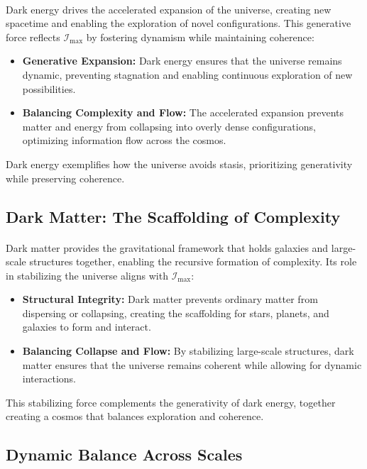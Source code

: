 \documentclass[12pt]{article}
\begin{document}
\paragraph{}
Dark energy drives the accelerated expansion of the universe, creating new spacetime and enabling the exploration of novel configurations. This generative force reflects \(\mathcal{I}_{\text{max}}\) by fostering dynamism while maintaining coherence:
\begin{itemize}
    \item \textbf{Generative Expansion:} Dark energy ensures that the universe remains dynamic, preventing stagnation and enabling continuous exploration of new possibilities.
    \item \textbf{Balancing Complexity and Flow:} The accelerated expansion prevents matter and energy from collapsing into overly dense configurations, optimizing information flow across the cosmos.
\end{itemize}
Dark energy exemplifies how the universe avoids stasis, prioritizing generativity while preserving coherence.

\subsection{Dark Matter: The Scaffolding of Complexity}
\paragraph{}
Dark matter provides the gravitational framework that holds galaxies and large-scale structures together, enabling the recursive formation of complexity. Its role in stabilizing the universe aligns with \(\mathcal{I}_{\text{max}}\):
\begin{itemize}
    \item \textbf{Structural Integrity:} Dark matter prevents ordinary matter from dispersing or collapsing, creating the scaffolding for stars, planets, and galaxies to form and interact.
    \item \textbf{Balancing Collapse and Flow:} By stabilizing large-scale structures, dark matter ensures that the universe remains coherent while allowing for dynamic interactions.
\end{itemize}
This stabilizing force complements the generativity of dark energy, together creating a cosmos that balances exploration and coherence.

\subsection{Dynamic Balance Across Scales}
\end{document}
